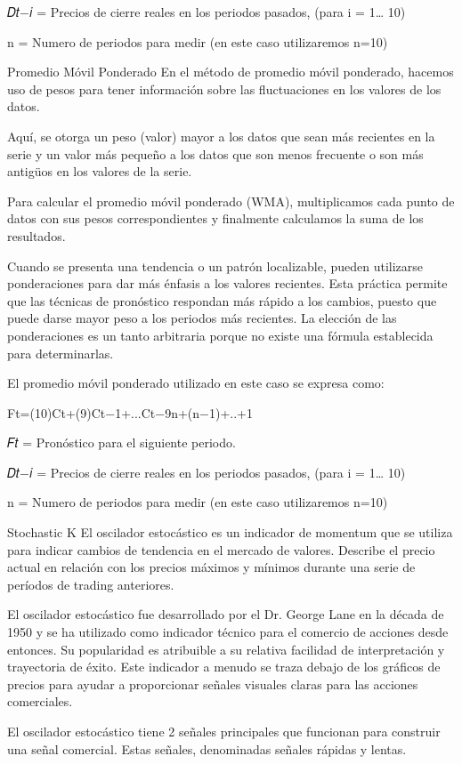 \documentclass[11pt]{article}
\begin{document}
𝐷𝑡−𝑖 = Precios de cierre reales en los periodos pasados, (para i = 1… 10)

n = Numero de periodos para medir (en este caso utilizaremos n=10)

Promedio Móvil Ponderado
En el método de promedio móvil ponderado, hacemos uso de pesos para tener información sobre las fluctuaciones en los valores de los datos.

Aquí, se otorga un peso (valor) mayor a los datos que sean más recientes en la serie y un valor más pequeño a los datos que son menos frecuente o son más antigüos en los valores de la serie.

Para calcular el promedio móvil ponderado (WMA), multiplicamos cada punto de datos con sus pesos correspondientes y finalmente calculamos la suma de los resultados.

Cuando se presenta una tendencia o un patrón localizable, pueden utilizarse ponderaciones para dar más énfasis a los valores recientes. Esta práctica permite que las técnicas de pronóstico respondan más rápido a los cambios, puesto que puede darse mayor peso a los periodos más recientes. La elección de las ponderaciones es un tanto arbitraria porque no existe una fórmula establecida para determinarlas.

El promedio móvil ponderado utilizado en este caso se expresa como:

Ft=(10)Ct+(9)Ct−1+...Ct−9n+(n−1)+..+1 

𝐹𝑡 = Pronóstico para el siguiente periodo.

𝐷𝑡−𝑖 = Precios de cierre reales en los periodos pasados, (para i = 1… 10)

n = Numero de periodos para medir (en este caso utilizaremos n=10)

Stochastic K%
El oscilador estocástico es un indicador de momentum que se utiliza para indicar cambios de tendencia en el mercado de valores. Describe el precio actual en relación con los precios máximos y mínimos durante una serie de períodos de trading anteriores.

El oscilador estocástico fue desarrollado por el Dr. George Lane en la década de 1950 y se ha utilizado como indicador técnico para el comercio de acciones desde entonces. Su popularidad es atribuible a su relativa facilidad de interpretación y trayectoria de éxito. Este indicador a menudo se traza debajo de los gráficos de precios para ayudar a proporcionar señales visuales claras para las acciones comerciales.

El oscilador estocástico tiene 2 señales principales que funcionan para construir una señal comercial. Estas señales, denominadas señales rápidas y lentas.
\end{document}
